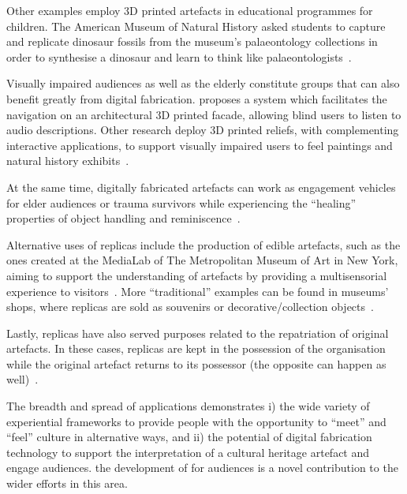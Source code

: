 \documentclass[acmlarge,screen,dvipsnames]{acmart}
\begin{document}
Other examples employ 3D printed artefacts in educational programmes
for children. The American Museum of Natural History asked students to
capture and replicate dinosaur fossils from the museum's palaeontology
collections in order to synthesise a dinosaur and learn to think like
palaeontologists~\cite{AMNH2013}. 

Visually impaired audiences as well as the elderly constitute groups
that can also benefit greatly from digital fabrication. \cite{DAgnano2015} proposes a system which
facilitates the navigation on an architectural 3D printed facade,
allowing blind users to listen to audio descriptions. Other research deploy 
3D printed reliefs, with complementing interactive
applications, to support visually impaired users to feel paintings and
natural history exhibits~\cite{Reichinger2016a,Samaroudi2017}.

At the same time, digitally fabricated artefacts can work as
engagement vehicles for elder audiences or trauma survivors while
experiencing the ``healing'' properties of object handling and
reminiscence~\cite{PleaseTouch2016}.

Alternative uses of replicas include the production of edible
artefacts, such as the ones created at the MediaLab of The
Metropolitan Museum of Art in New York, aiming to support the
understanding of artefacts by providing a multisensorial experience to
visitors~\cite{Tang2015}. More ``traditional'' examples can be found
in museums' shops, where replicas are sold as souvenirs or
decorative/collection objects~\cite{Young2017}.

Lastly, replicas have also served purposes related to the repatriation
of original artefacts. In these cases, replicas are kept in the
possession of the organisation while the original artefact returns to
its possessor (the opposite can happen as well)~\cite{Hollinger2013}.
 
The breadth and spread of applications demonstrates i) the wide
variety of experiential frameworks to provide people with the
opportunity to ``meet'' and ``feel'' culture in alternative ways, and
ii) the potential of digital fabrication technology to support the
interpretation of a cultural heritage artefact and engage audiences.  the development of
  for audiences is a novel contribution to
the wider efforts in this area.
\end{document}
